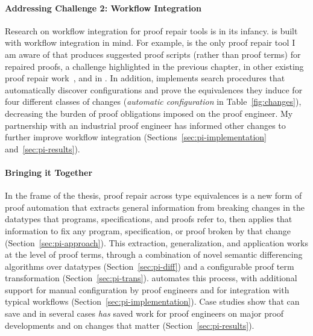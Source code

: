 \paragraph{Addressing Challenge 2: Workflow Integration}
Research on workflow integration for proof repair tools is in its infancy.
\toolnamec is built with workflow integration in mind.
For example, \toolnamec is the only proof repair tool I am aware of that produces suggested proof scripts (rather than proof terms) for repaired proofs,
a challenge highlighted in the previous chapter, in other existing proof repair work~\cite{robert2018}, and in .
In addition, \toolnamec implements search procedures that 
automatically discover configurations and prove the equivalences they induce for four different classes of 
changes (\textit{automatic configuration} in Table~\ref{fig:changes}),
decreasing the burden of proof obligations imposed on the proof engineer.
My partnership with an industrial proof engineer has informed other changes to further improve workflow integration
(Sections~\ref{sec:pi-implementation} and~\ref{sec:pi-results}).

\paragraph{Bringing it Together}
In the frame of the thesis, proof repair across type equivalences is a new form of proof automation that extracts general information from breaking 
changes in the datatypes that programs, specifications, and proofs refer to, 
then applies that information to fix any program, specification, or proof broken by that change (Section~\ref{sec:pi-approach}).
This extraction, generalization, and application works at the level of proof terms, through a combination of novel semantic differencing algorithms over datatypes (Section~\ref{sec:pi-diff}) and a configurable proof term transformation (Section~\ref{sec:pi-trans}).
\toolnamec automates this process,
with additional support for manual configuration by proof engineers and for integration with 
typical  workflows (Section~\ref{sec:pi-implementation}).
Case studies show that \toolnamec can save and in several cases \textit{has} saved work for proof engineers on major proof developments and on
changes that matter (Section~\ref{sec:pi-results}).















